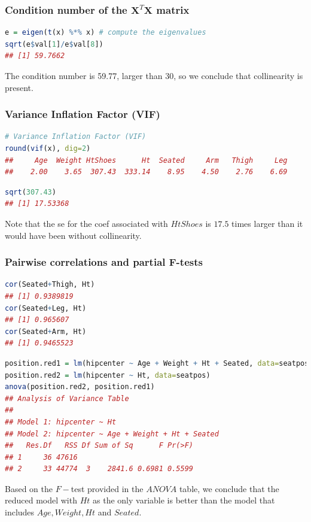 \documentclass[11pt,a4paper]{article}
\begin{document}
\subsubsection{Condition number of the $\mathbf{X}^T \mathbf{X}$ matrix}
\begin{lstlisting}[language=R]
e = eigen(t(x) %*% x) # compute the eigenvalues
sqrt(e$val[1]/e$val[8])
## [1] 59.7662
\end{lstlisting}
The condition number is 59.77, larger than 30, so we conclude that collinearity is present.

\subsubsection{Variance Inflation Factor (VIF)}
\begin{lstlisting}[language=R]
# Variance Inflation Factor (VIF)
round(vif(x), dig=2)
##     Age  Weight HtShoes      Ht  Seated     Arm   Thigh     Leg 
##    2.00    3.65  307.43  333.14    8.95    4.50    2.76    6.69
\end{lstlisting}
\begin{lstlisting}[language=R]
sqrt(307.43)
## [1] 17.53368
\end{lstlisting}
Note that the se for the coef associated with $HtShoes$ is $17.5$ times larger than it would have been without collinearity.

\subsubsection{Pairwise correlations and partial F-tests}
\begin{lstlisting}[language=R]
cor(Seated+Thigh, Ht)
## [1] 0.9389819
cor(Seated+Leg, Ht)
## [1] 0.965607
cor(Seated+Arm, Ht)
## [1] 0.9465523
\end{lstlisting}
\begin{lstlisting}[language=R]
position.red1 = lm(hipcenter ~ Age + Weight + Ht + Seated, data=seatpos)
position.red2 = lm(hipcenter ~ Ht, data=seatpos)
anova(position.red2, position.red1)
## Analysis of Variance Table
##
## Model 1: hipcenter ~ Ht
## Model 2: hipcenter ~ Age + Weight + Ht + Seated
##   Res.Df   RSS Df Sum of Sq      F Pr(>F)
## 1     36 47616
## 2     33 44774  3    2841.6 0.6981 0.5599
\end{lstlisting}
Based on the $F-$test provided in the $ANOVA$ table, we conclude that the reduced model with $Ht$ as the only variable is better than the model that includes $Age, Weight, Ht$ and $Seated$.
\end{document}

